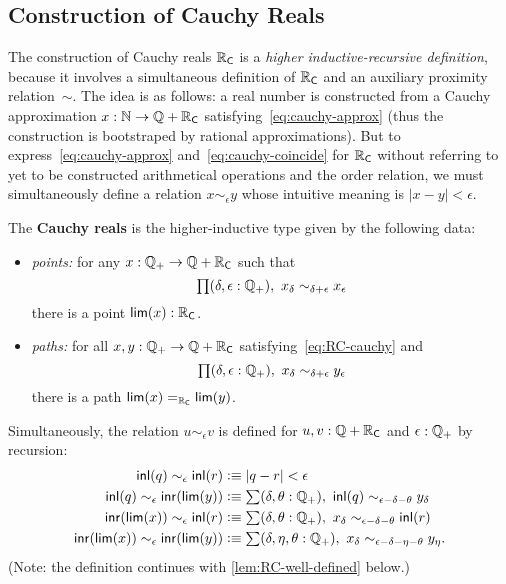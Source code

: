 \subsection{Construction of Cauchy Reals}
\label{sec:constr-cauchy-reals}

The construction of Cauchy reals $\RC$ is a \emph{higher inductive-recursive definition},
because it involves a simultaneous definition of $\RC$ and an auxiliary proximity
relation~$\sim$. The idea is as follows: a real number is constructed from a Cauchy
approximation $x : \N \to \Q + \RC$ satisfying~\eqref{eq:cauchy-approx} (thus the
construction is bootstraped by rational approximations). But to
express~\eqref{eq:cauchy-approx} and~\eqref{eq:cauchy-coincide} for $\RC$ without
referring to yet to be constructed arithmetical operations and the order relation, we must
simultaneously define a relation $x \sim_\epsilon y$ whose intuitive meaning is $|x - y| <
\epsilon$.

\begin{defn}\label{defn:cauchy-reals}
  The \textbf{Cauchy reals \RC} is the higher-inductive type given by the following data:
  \begin{itemize}
  \item \emph{points:} for any $x : \Qp \to \Q + \RC$ such that
    \begin{equation}
      \label{eq:RC-cauchy}
      \prd{\delta, \epsilon : \Qp} x_\delta \sim_{\delta + \epsilon} x_\epsilon
    \end{equation}
    there is a point $\rclim(x) : \RC$.
  \item \emph{paths:} for all $x, y : \Qp \to \Q + \RC$ satisfying~\eqref{eq:RC-cauchy} and
    \begin{equation}
      \label{eq:RC-coincide}
      \prd{\delta, \epsilon : \Qp} x_\delta \sim_{\delta + \epsilon} y_\epsilon
    \end{equation}
    there is a path $\id[\RC]{\rclim(x)}{\rclim(y)}$.
  \end{itemize}
  Simultaneously, the relation $u \sim_\epsilon v$ is defined for $u, v : \Q + \RC$ and
  $\epsilon : \Qp$ by recursion:
  \begin{align*}
    \inl(q) \sim_\epsilon \inl(r)  &\defeq
    |q - r| < \epsilon
    \\
    \inl(q) \sim_\epsilon \inr(\rclim(y)) &\defeq
    \sm{\delta, \theta : \Qp} \inl(q) \sim_{\epsilon - \delta - \theta} y_\delta
    \\
    \inr(\rclim(x)) \sim_\epsilon \inl(r) &\defeq
    \sm{\delta, \theta : \Qp} x_\delta \sim_{\epsilon - \delta - \theta} \inl(r)
    \\
    \inr(\rclim(x)) \sim_\epsilon \inr(\rclim(y)) &\defeq
    \sm{\delta, \eta, \theta : \Qp} x_\delta \sim_{\epsilon - \delta - \eta - \theta} y_\eta.
  \end{align*}  
  (Note: the definition continues with \autoref{lem:RC-well-defined} below.)
\end{defn}

